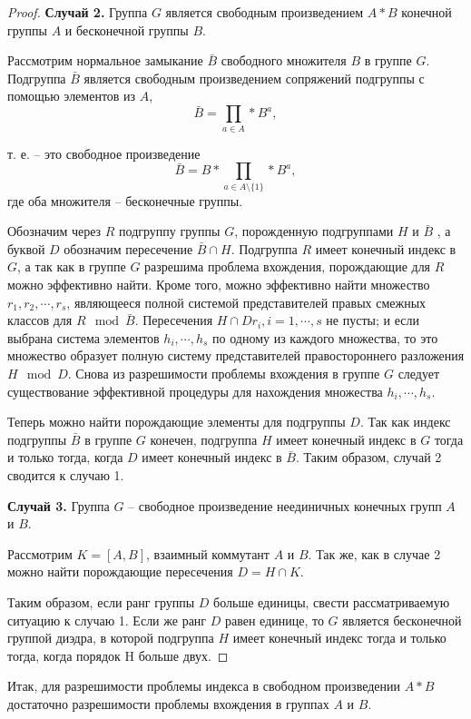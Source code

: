 \documentclass[twoside]{mfitjournal}
\begin{document}
\begin{proof}
\textbf{Случай 2.} Группа $G$ является свободным произведением $A\ast B$ конечной группы $A$ и бесконечной группы $B$.

Рассмотрим нормальное замыкание $\bar{B}$ свободного множителя $B$ в группе $G$. Подгруппа $\bar{B}$  является свободным произведением сопряжений подгруппы с помощью элементов из $A$, 
\[
\bar{B}=\prod\limits_{a\in A}\ast B^a,
\]

т. е. – это свободное произведение 
\[
\bar{B}=B\ast\prod\limits_{a\in A\setminus \{1\}}\ast B^a,
\]
где оба множителя -- бесконечные группы. 

Обозначим через $R$ подгруппу группы $G$, порожденную подгруппами $H$ и $ \bar{B} $ , а буквой $D$ обозначим пересечение  $ \bar{B}\cap H $.  Подгруппа $R$ имеет конечный индекс в $G$, а так как в группе $G$ разрешима проблема вхождения, порождающие для $R$ можно эффективно найти. Кроме того, можно эффективно найти множество $r_1, r_2,\cdots, r_s$, являющееся полной системой представителей правых смежных классов для $ R\mod\bar{B} $.  Пересечения  $ H\cap Dr_i, i=1,\cdots,s$ не пусты; и если выбрана система элементов $ h_i,\cdots,h_s $  по одному из каждого множества, то это множество образует полную систему представителей правостороннего разложения $H\mod D $.  Снова из разрешимости проблемы вхождения в группе $G$ следует существование эффективной процедуры для нахождения множества  $ h_i,\cdots,h_s $.

Теперь можно найти порождающие элементы для подгруппы $D$. Так как индекс подгруппы  $\bar{B} $ в группе $G$ конечен, подгруппа $H$ имеет конечный индекс в $G$ тогда и только тогда, когда $D$ имеет конечный индекс в $\bar{B}$. 
Таким образом, случай 2 сводится к случаю 1.

\textbf{Случай 3.} Группа $G$ – свободное произведение неединичных конечных групп $A$ и $B$.

Рассмотрим $K = [A, B]$, взаимный коммутант $A$ и $B$. Так же, как в случае 2 можно найти порождающие пересечения $D = H \cap K$. 

Таким образом, если ранг группы $D$  больше единицы, свести рассматриваемую ситуацию к случаю 1. Если же ранг $D$  равен единице, то $G$ является  бесконечной группой диэдра, в которой подгруппа $H$ имеет конечный индекс тогда и только тогда, когда порядок H больше двух.

\end{proof}

Итак, для разрешимости проблемы индекса в свободном произведении $A \ast B$ достаточно разрешимости проблемы вхождения в группах $A$ и $B$.
\end{document}
